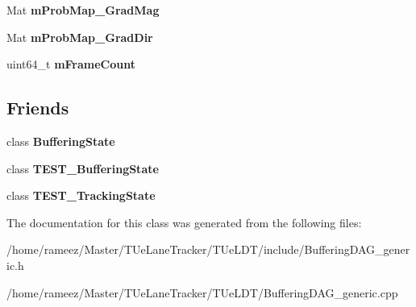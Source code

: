 \begin{DoxyCompactItemize}
\item 
\hypertarget{classBufferingDAG__generic_a700212b57de614f4763d8b345c2a06c4}{Mat {\bfseries m\-Prob\-Map\-\_\-\-Grad\-Mag}}\label{classBufferingDAG__generic_a700212b57de614f4763d8b345c2a06c4}

\item 
\hypertarget{classBufferingDAG__generic_a10a2b2efa34a2908ca713a81a0ebceed}{Mat {\bfseries m\-Prob\-Map\-\_\-\-Grad\-Dir}}\label{classBufferingDAG__generic_a10a2b2efa34a2908ca713a81a0ebceed}

\item 
\hypertarget{classBufferingDAG__generic_a10eaaacc6922fc65a24abbda1aba8054}{uint64\-\_\-t {\bfseries m\-Frame\-Count}}\label{classBufferingDAG__generic_a10eaaacc6922fc65a24abbda1aba8054}

\end{DoxyCompactItemize}
\subsection*{Friends}
\begin{DoxyCompactItemize}
\item 
\hypertarget{classBufferingDAG__generic_afcf0911536b5245e56993e60557631ea}{class {\bfseries Buffering\-State}}\label{classBufferingDAG__generic_afcf0911536b5245e56993e60557631ea}

\item 
\hypertarget{classBufferingDAG__generic_ae434ad700893dfcec0c63fdb5a1b7d54}{class {\bfseries T\-E\-S\-T\-\_\-\-Buffering\-State}}\label{classBufferingDAG__generic_ae434ad700893dfcec0c63fdb5a1b7d54}

\item 
\hypertarget{classBufferingDAG__generic_a3084c090c58f2a0dcf5e638b19d63653}{class {\bfseries T\-E\-S\-T\-\_\-\-Tracking\-State}}\label{classBufferingDAG__generic_a3084c090c58f2a0dcf5e638b19d63653}

\end{DoxyCompactItemize}


The documentation for this class was generated from the following files\-:\begin{DoxyCompactItemize}
\item 
/home/rameez/\-Master/\-T\-Ue\-Lane\-Tracker/\-T\-Ue\-L\-D\-T/include/Buffering\-D\-A\-G\-\_\-generic.\-h\item 
/home/rameez/\-Master/\-T\-Ue\-Lane\-Tracker/\-T\-Ue\-L\-D\-T/Buffering\-D\-A\-G\-\_\-generic.\-cpp\end{DoxyCompactItemize}
